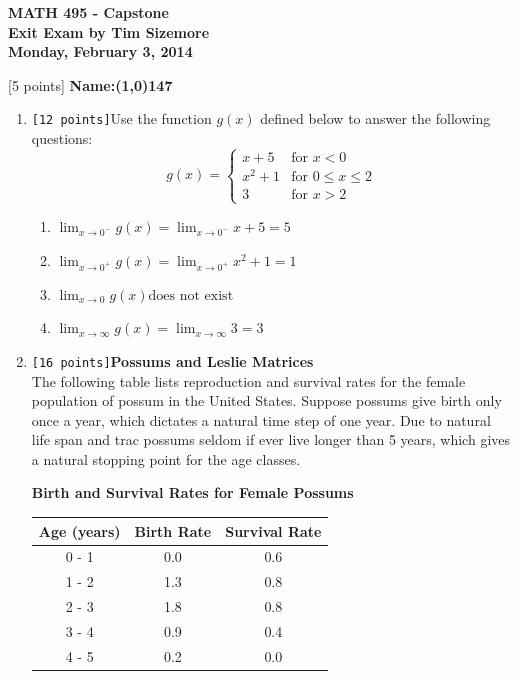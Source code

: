 \documentclass[10pt]{article}
\begin{document}
\def\R{\mathbb{R}}

\begin{center}
    \textbf{MATH 495 - Capstone \\
    Exit Exam by Tim Sizemore \\
    Monday, February 3, 2014}
\end{center}

[5 points] \textbf{Name:\line(1,0){147}}
\\
\begin{enumerate}
    \item \verb![12 points]!Use the function $g(x)$ defined below to answer the following questions: \\
    $$
    g(x) =
    \begin{cases}
        x + 5 & \text{for } x < 0  \\
        x^2 + 1 & \text{for } 0 \le x \le 2 \\
        3 & \text{for } x > 2
    \end{cases}
    $$

    \begin{enumerate}
        \item $\displaystyle\lim_{x \to 0^-} g(x) = \lim_{x \to 0^-} x + 5 = 5$
        \item $\displaystyle\lim_{x \to 0^+} g(x) = \lim_{x \to 0^+} x^2 + 1 = 1$
        \item $\displaystyle\lim_{x \to 0} g(x) \text{does not exist}$
        \item $\displaystyle\lim_{x \to \infty} g(x) = \lim_{x \to \infty} 3 = 3$
    \end{enumerate}

    \item \verb![16 points]!\textbf{Possums and Leslie Matrices} \\
    The following table lists reproduction and survival rates for the female population of possum in the United States.
    Suppose possums give birth only once a year, which dictates a natural time step of one year. Due to natural life
    span and trac possums seldom if ever live longer than 5 years, which gives a natural stopping point for the age
    classes.

        \begin{center}
            \textbf{Birth and Survival Rates for Female Possums} \\
            \vspace{4mm}
            \begin{tabular}{|c|c|c|}
                \hline
                Age (years) & Birth Rate & Survival Rate \\
                \hline
                0 - 1 & 0.0 & 0.6 \\
                1 - 2 & 1.3 & 0.8 \\
                2 - 3 & 1.8 & 0.8 \\
                3 - 4 & 0.9 & 0.4 \\
                4 - 5 & 0.2 & 0.0 \\
                \hline
            \end{tabular}
        \end{center}


\end{enumerate}
\end{document}
